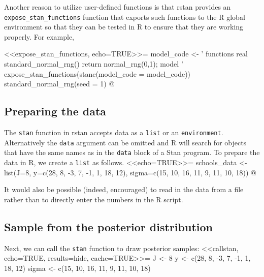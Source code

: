 \documentclass[12pt]{article}
\newcommand{\R}{R\xspace}
\newcommand{\code}[1]{{\tt #1}}
\newcommand{\strong}[1]{\texorpdfstring%
          {{\normalfont\fontseries{b}\selectfont #1}}%
            {#1}}
\let\pkg=\strong
\begin{document}
              Another reason to utilize user-defined functions is that \pkg{rstan} provides an \\ 
              \code{expose\_stan\_functions} function that exports such functions to the \R global environment so
              that they can be tested in \R to ensure that they are working properly. For example,
              
              <<expose_stan_functions, echo=TRUE>>=
                model_code <-
                '
              functions {
              real standard_normal_rng() {
              return normal_rng(0,1);
              }
              }
              model {}
              '
              expose_stan_functions(stanc(model_code = model_code))
              standard_normal_rng(seed = 1)
              @
                
                
                \subsection{Preparing the data}
              
              The \code{stan} function in \pkg{rstan} accepts data as a \code{list} or an \code{environment}.
              Alternatively the \code{data} argument can be omitted and \R will search for objects that
              have the same names as in the \code{data} block of a Stan program.
              To prepare the data in \R, we create a \code{list} as follows. 
              <<echo=TRUE>>=
                schools_data <- 
                list(J=8, 
                     y=c(28,  8, -3,  7, -1,  1, 18, 12),
                     sigma=c(15, 10, 16, 11,  9, 11, 10, 18))
              @
                
                It would also be possible (indeed, encouraged) to read in the data
              from a file rather than to directly enter 
              the numbers in the \R script. 
              
              \subsection{Sample from the posterior distribution}
              \label{subsec0stansampling}
              
              Next, we can call the \code{stan} function to draw posterior samples:
                <<callstan, echo=TRUE, results=hide, cache=TRUE>>=
                J <- 8
              y <- c(28,  8, -3,  7, -1,  1, 18, 12)
              sigma <- c(15, 10, 16, 11,  9, 11, 10, 18)
              
\end{document}
